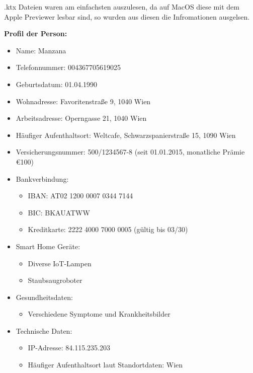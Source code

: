 \documentclass[12pt, a4paper, titlepage, oneside]{scrartcl}
\begin{document}
	.ktx Dateien waren am einfachsten auszulesen, da auf MacOS diese mit dem Apple
	Previewer lesbar sind, so wurden aus diesen die Infromationen ausgelsen.

	\textbf{Profil der Person:}
	\begin{itemize}
		\item Name: Manzana

		\item Telefonnummer: 004367705619025

		\item Geburtsdatum: 01.04.1990

		\item Wohnadresse: Favoritenstraße 9, 1040 Wien

		\item Arbeitsadresse: Operngasse 21, 1040 Wien

		\item Häufiger Aufenthaltsort: Weltcafe, Schwarzspanierstraße 15, 1090 Wien

		\item Versicherungsnummer: 500/1234567-8 (seit 01.01.2015, monatliche Prämie
			€100)

		\item Bankverbindung:
			\begin{itemize}
				\item IBAN: AT02 1200 0007 0344 7144

				\item BIC: BKAUATWW

				\item Kreditkarte: 2222 4000 7000 0005 (gültig bis 03/30)
			\end{itemize}

		\item Smart Home Geräte:
			\begin{itemize}
				\item Diverse IoT-Lampen

				\item Staubsaugroboter
			\end{itemize}

		\item Gesundheitsdaten:
			\begin{itemize}
				\item Verschiedene Symptome und Krankheitsbilder
			\end{itemize}

		\item Technische Daten:
			\begin{itemize}
				\item IP-Adresse: 84.115.235.203

				\item Häufiger Aufenthaltsort laut Standortdaten: Wien
			\end{itemize}
	\end{itemize}
\end{document}
